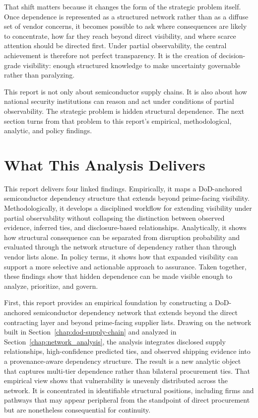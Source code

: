 That shift matters because it changes the form of the strategic problem itself. Once dependence is represented as a structured network rather than as a diffuse set of vendor concerns, it becomes possible to ask where consequences are likely to concentrate, how far they reach beyond direct visibility, and where scarce attention should be directed first. Under partial observability, the central achievement is therefore not perfect transparency. It is the creation of decision-grade visibility: enough structured knowledge to make uncertainty governable rather than paralyzing.

This report is not only about semiconductor supply chains. It is also about how national security institutions can reason and act under conditions of partial observability. The strategic problem is hidden structural dependence. The next section turns from that problem to this report's empirical, methodological, analytic, and policy findings.

\section{What This Analysis Delivers}
\label{sec:ch6_what_this_analysis_delivers}

This report delivers four linked findings. Empirically, it maps a DoD-anchored semiconductor dependency structure that extends beyond prime-facing visibility. Methodologically, it develops a disciplined workflow for extending visibility under partial observability without collapsing the distinction between observed evidence, inferred ties, and disclosure-based relationships. Analytically, it shows how structural consequence can be separated from disruption probability and evaluated through the network structure of dependency rather than through vendor lists alone. In policy terms, it shows how that expanded visibility can support a more selective and actionable approach to assurance. Taken together, these findings show that hidden dependence can be made visible enough to analyze, prioritize, and govern.

First, this report provides an empirical foundation by constructing a DoD-anchored semiconductor dependency network that extends beyond the direct contracting layer and beyond prime-facing supplier lists. Drawing on the network built in Section~\ref{chap:dod-supply-chain} and analyzed in Section~\ref{chap:network_analysis}, the analysis integrates disclosed supply relationships, high-confidence predicted ties, and observed shipping evidence into a provenance-aware dependency structure. The result is a new analytic object that captures multi-tier dependence rather than bilateral procurement ties. That empirical view shows that vulnerability is unevenly distributed across the network. It is concentrated in identifiable structural positions, including firms and pathways that may appear peripheral from the standpoint of direct procurement but are nonetheless consequential for continuity.

